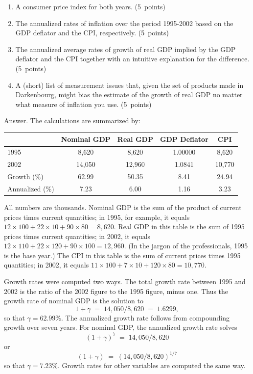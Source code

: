 \documentclass[letterpaper,12pt]{article}
\begin{document}
\begin{enumerate}
\begin{enumerate}
\item A consumer price index for both years. (5~points)

\item The annualized rates of inflation over the period 1995-2002
based on the GDP deflator and the CPI, respectively.
(5~points)

\item  The annualized average rates of growth of real GDP
implied by the GDP deflator and the CPI together with an
intuitive explanation for the difference. (5~points)

\item  A (short) list of measurement issues that, given the set of
products made in Darkenbourg, might bias the estimate of the
growth of real GDP no matter what measure of inflation you use.
(5~points)
\end{enumerate}


Answer.
The calculations are summarized by:
\begin{center}
\begin{tabular}{lcccc}
\hline\hline
         &  Nominal GDP  & Real GDP   &  GDP Deflator  & CPI \\
 \hline\hline
1995     &   8,620  & 8,620  &  1.00000 &  8,620  \\
2002     &   14,050  &  12,960 & 1.0841 & 10,770 \\
Growth (\%)  & 62.99  &  50.35  &  8.41  &  24.94  \\

Annualized (\%) & 7.23 & 6.00 & 1.16 & 3.23 \\
\hline\hline
\end{tabular}
\end{center}
All numbers are thousands. Nominal GDP is the sum of the
product of current prices times current quantities; in 1995, for
example, it equals $12\times 100+22 \times 10+ 90\times 80 =
8,620$.  Real GDP in this table is the sum of 1995 prices times
current quantities; in 2002, it equals $12\times 110+22 \times
120+ 90\times 100 = 12,960$.  (In the jargon of the professionals,
1995 is the base year.) The CPI in this table is the sum of
current prices times 1995 quantities; in 2002, it equals 
$11\times 100+ 7\times 10+ 120\times 80 = 10,770$.

Growth rates were computed two ways.  The total growth rate
between 1995 and 2002 is the ratio of the 2002 figure to the 1995
figure, minus one.  Thus the growth rate of nominal GDP is the
solution to
\[
    1 + \gamma \;=\; 14,050/8,620 \;=\; 1.6299 ,
\]
so that $\gamma = 62.99\%$.  The annualized growth rate follows
from compounding growth over seven years.  For nominal GDP, the
annualized growth rate solves
\[
    (1 + \gamma)^7 \;=\; 14,050/8,620
\]
or
\[
    (1 + \gamma) \;=\; (14,050/8,620)^{1/7}
\]
so that $\gamma = 7.23\%$.  Growth rates for other variables are
computed the same way.


\end{enumerate}
\end{document}
